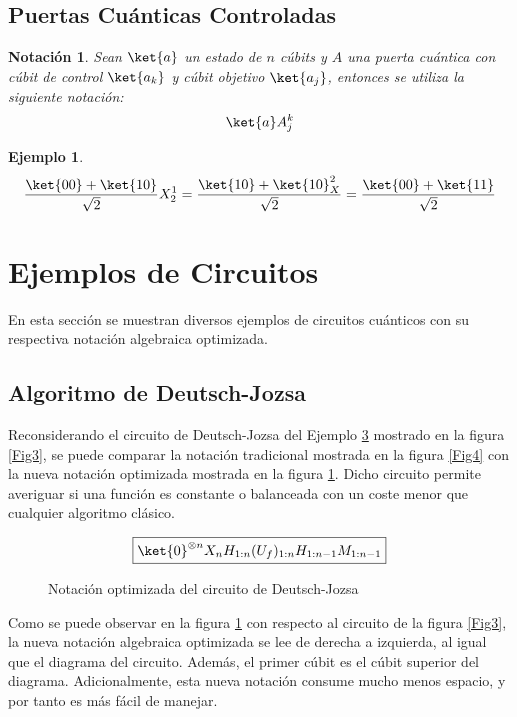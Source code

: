 \documentclass[10pt,conference,a4paper]{IEEEtran}
\newtheorem{notacion}{Notación}[subsection]
\newtheorem{ejemplo}{Ejemplo}
\begin{document}
    \subsection{Puertas Cuánticas Controladas}

    \begin{notacion}
        Sean $\ket{a}$ un estado de $n$ cúbits y $A$ una puerta cuántica con cúbit de control $\ket{a_k}$ y cúbit objetivo $\ket{a_j}$, entonces se utiliza la siguiente notación:
        \begin{equation}
            \ket{a}A_j^k
        \end{equation}
    \end{notacion}

    \begin{ejemplo}
        \begin{align*}
            \dfrac{\ket{00}+\ket{10}}{\sqrt{2}}X_2^1=\dfrac{\ket{10}+\ket{10}_X^2}{\sqrt{2}}=\dfrac{\ket{00}+\ket{11}}{\sqrt{2}}
        \end{align*}
    \end{ejemplo}
    \vspace{0.35cm}
    \section{Ejemplos de Circuitos}
    \label{seccion:4}
    En esta sección se muestran diversos ejemplos de circuitos cuánticos con su respectiva notación algebraica optimizada.
    \subsection{Algoritmo de Deutsch-Jozsa}
    Reconsiderando el circuito de Deutsch-Jozsa  del Ejemplo \hyperlink{fig:deutsch-jozsa}{3} mostrado en la figura \ref{Fig3}, se puede comparar la notación tradicional mostrada en la figura \ref{Fig4} con la nueva notación   optimizada mostrada en la figura \ref{Fig5}. Dicho circuito permite averiguar si una función es constante o balanceada con un coste menor que cualquier algoritmo clásico.

    \begin{figure}[htb!]
        $$\boxed{\ket{0}^{\otimes n}X_nH_{1:n}(U_{f})_{1:n}H_{1:n-1}M_{1:n-1}}$$
        \caption{Notación  optimizada del circuito de Deutsch-Jozsa}
        \label{Fig5}
    \end{figure}


    Como se puede observar en la figura \ref{Fig5} con respecto al circuito de la figura \ref{Fig3}, la nueva notación algebraica optimizada se lee de derecha a izquierda, al igual que el diagrama del circuito. Además, el primer cúbit es el cúbit superior del diagrama. Adicionalmente, esta nueva notación consume mucho menos espacio, y por tanto es más fácil de manejar.
\end{document}

